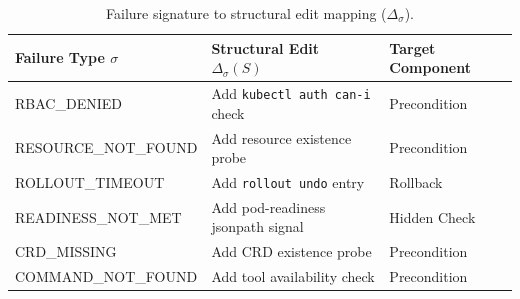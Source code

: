\begin{table}[t]
\centering
\caption{Failure signature to structural edit mapping ($\Delta_\sigma$).}
\label{tab:delta-sigma}
\small
\begin{tabular}{lll}
\toprule
\textbf{Failure Type $\sigma$} & \textbf{Structural Edit $\Delta_\sigma(S)$} & \textbf{Target Component} \\
\midrule
RBAC\_DENIED & Add \texttt{kubectl auth can-i} check & Precondition \\
RESOURCE\_NOT\_FOUND & Add resource existence probe & Precondition \\
ROLLOUT\_TIMEOUT & Add \texttt{rollout undo} entry & Rollback \\
READINESS\_NOT\_MET & Add pod-readiness jsonpath signal & Hidden Check \\
CRD\_MISSING & Add CRD existence probe & Precondition \\
COMMAND\_NOT\_FOUND & Add tool availability check & Precondition \\
\bottomrule
\end{tabular}
\end{table}